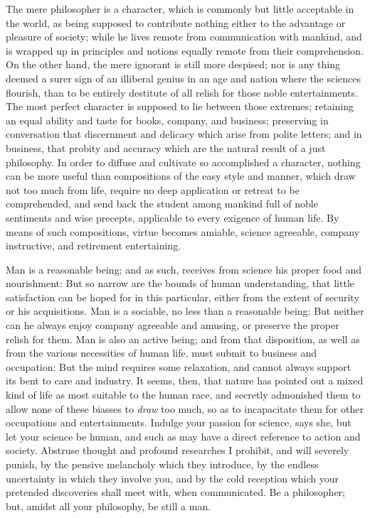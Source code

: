 \documentclass[]{article}
\begin{document}
\begin{sectionbody}
\humeparagraph  The mere philosopher is a character, which is commonly but little acceptable in the world, as being supposed to contribute nothing either to the advantage or pleasure of society; while he lives remote from communication with mankind, and is wrapped up in principles and notions equally remote from their comprehension. On the other hand, the mere ignorant is still more despised; nor is any thing deemed a surer sign of an illiberal genius in an age and nation where the sciences flourish, than to be entirely destitute of all relish for those noble entertainments. The most perfect character is supposed to lie between those extremes; retaining an equal ability and taste for books, company, and business; preserving in conversation that discernment and delicacy which arise from polite letters; and in business, that probity and accuracy which are the natural result of a just philosophy. In order to diffuse and cultivate so accomplished a character, nothing can be more useful than compositions of the easy style and manner, which draw not too much from life, require no deep application or retreat to be comprehended, and send back the student among mankind full of noble sentiments and wise precepts, applicable to every exigence of human life. By means of such compositions, virtue becomes amiable, science agreeable, company instructive, and retirement entertaining.

Man is a reasonable being; and as such, receives from science his proper food and nourishment: But so narrow are the bounds of human understanding, that little satisfaction can be hoped for in this particular, either from the extent of security or his acquisitions. Man is a sociable, no less than a reasonable being: But neither can he always enjoy company agreeable and amusing, or preserve the proper relish for them. Man is also an active being; and from that disposition, as well as from the various necessities of human life, must submit to business and occupation: But the mind requires some relaxation, and cannot always support its bent to care and industry. It seems, then, that nature has pointed out a mixed kind of life as most suitable to the human race, and secretly admonished them to allow none of these biasses to \emph{draw} too much, so as to incapacitate them for other occupations and entertainments. Indulge your passion for science, says she, but let your science be human, and such as may have a direct reference to action and society. Abstruse thought and profound researches I prohibit, and will severely punish, by the pensive melancholy which they introduce, by the endless uncertainty in which they involve you, and by the cold reception which your pretended discoveries shall meet with, when communicated. Be a philosopher; but, amidst all your philosophy, be still a man.


\end{sectionbody}
\end{document}
